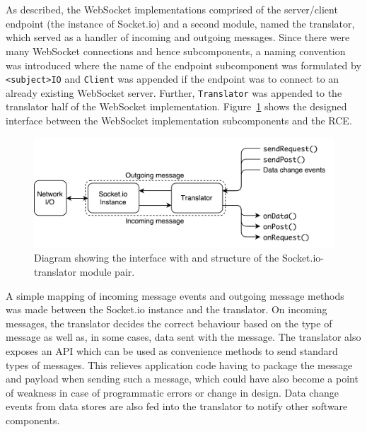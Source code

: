       
      \\\\
        As described, the WebSocket implementations comprised of the server/client endpoint (the instance of Socket.io) and a second module, named the translator, which served as a handler of incoming and outgoing messages. Since there were many WebSocket connections and hence subcomponents, a naming convention was introduced where the name of the endpoint subcomponent was formulated by \texttt{<subject>IO} and \texttt{Client} was appended if the endpoint was to connect to an already existing WebSocket server. Further, \texttt{Translator} was appended to the translator half of the WebSocket implementation. Figure~\ref{fig:softDesign-webSocketDesign} shows the designed interface between the WebSocket implementation subcomponents and the RCE.
        
        \begin{figure}[h!]
          \centering
          \includegraphics[width=0.75\linewidth]{figures/softDesign-webSocketDesign}
          \caption[Diagram showing the interface with and structure of the Socket.io-translator module pair.]{Diagram showing the interface with and structure of the Socket.io-translator module pair.}
          \label{fig:softDesign-webSocketDesign}
        \end{figure}
        
        A simple mapping of incoming message events and outgoing message methods was made between the Socket.io instance and the translator. On incoming messages, the translator decides the correct behaviour based on the type of message as well as, in some cases, data sent with the message. The translator also exposes an API which can be used as convenience methods to send standard types of messages. This relieves application code having to package the message and payload when sending such a message, which could have also become a point of weakness in case of programmatic errors or change in design. Data change events from data stores are also fed into the translator to notify other software components.
                
           
